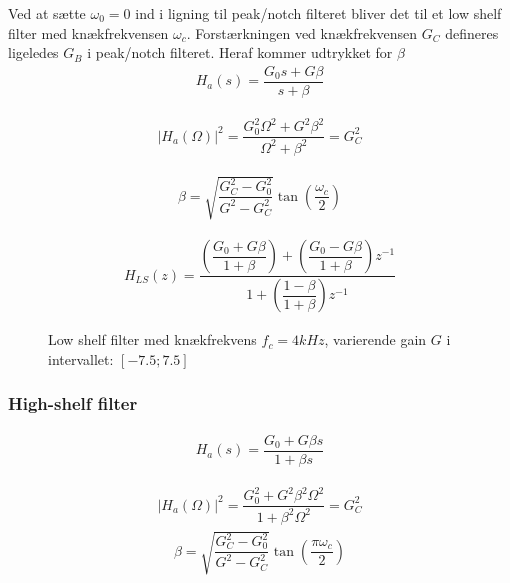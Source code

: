     Ved at sætte $\omega_0 = 0$ ind i ligning til peak/notch 
    filteret bliver det til et low shelf filter med knækfrekvensen $\omega_c$. 
    Forstærkningen ved knækfrekvensen $G_C$ defineres ligeledes $G_B$ i peak/notch filteret.
    Heraf kommer udtrykket for $\beta$ 
    \begin{align}
        H_a (s) = \dfrac{G_0 s + G \beta}{s + \beta}
    \end{align}

    \begin{align}
        |H_a (\Omega)|^2 = \dfrac{G_0^2 \Omega^2 + G^2 \beta^2}{\Omega^2 + \beta^2} = G_C^2
    \end{align}

    \begin{align}
        \beta = \sqrt{\dfrac{G_C^2 - G_0^2}{G^2 - G_C^2}} \tan \left( \dfrac{\omega_c}{2} \right)
    \end{align}

  
     \begin{align}
      H_{LS}(z) =   \dfrac{\left(\dfrac{G_0 + G \beta}{1 + \beta} \right)+ \left(\dfrac{ G_0 - G \beta}{1 + \beta }\right) z^{-1}}{1 + \left( \dfrac{1 - \beta}{1 + \beta} \right) z^{-1}}
     \end{align}

    \begin{figure}[H]
    \centering
        
        \caption{Low shelf filter med knækfrekvens $f_c = 4kHz$, varierende gain $G$ i intervallet: $[-7.5 ; 7.5]$}
    \end{figure} 
   
   
     \subsubsection{High-shelf filter}

     \begin{align}
        H_a (s) = \dfrac{G_0 + G \beta s}{1 + \beta s}
     \end{align}

     \begin{align}
         |H_a(\Omega)|^2 = \dfrac{G_0^2 + G^2 \beta^2 \Omega^2}{1 + \beta^2 \Omega^2} = G_C^2
     \end{align}
    \begin{align}
        \beta = \sqrt{\dfrac{G_C^2 - G_0^2}{G^2 - G_C^2}} \tan \left( \dfrac{\pi \omega_c}{2} \right)
    \end{align}


